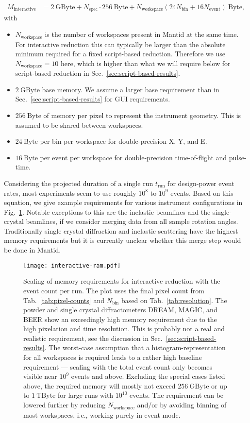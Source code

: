 \documentclass[a4paper,english,numbers=noenddot,bibliography=totoc,chapterprefix=on,DIV=12]{scrartcl}
\newcommand{\Trun}{t_{\text{run}}}
\newcommand{\Nbin}{N_{\text{bin}}}
\newcommand{\Nevent}{N_{\text{event}}}
\newcommand{\Nworkspace}{N_{\text{workspace}}}
\newcommand{\Nspec}{N_{\text{spec}}}
\newcommand{\beer}{BEER\xspace}
\newcommand{\dream}{DREAM\xspace}
\newcommand{\magic}{MAGIC\xspace}
\newcommand{\mantid}{Mantid\xspace}
\begin{document}
\begin{align}
  \label{eq:ram-interactive}
  M_{\text{interactive}} &= 2~\mathrm{GByte} + \Nspec \cdot 256~\mathrm{Byte} + N_{\text{workspace}}(24\Nbin + 16\Nevent)~\mathrm{Byte},
\end{align}
with
\begin{itemize}
  \item $\Nworkspace$ is the number of workspaces present in \mantid at the same time.
    For interactive reduction this can typically be larger than the absolute minimum required for a fixed script-based reduction.
    Therefore we use $\Nworkspace = 10$ here, which is higher than what we will require below for script-based reduction in Sec.~\ref{sec:script-based-results}.
  \item $2~\mathrm{GByte}$ base memory.
    We assume a larger base requirement than in Sec.~\ref{sec:script-based-results} for GUI requirements.
  \item $256~\mathrm{Byte}$ of memory per pixel to represent the instrument geometry.
    This is assumed to be shared between workspaces.
  \item $24~\mathrm{Byte}$ per bin per workspace for double-precision X, Y, and E.
  \item $16~\mathrm{Byte}$ per event per workspace for double-precision time-of-flight and pulse-time.
\end{itemize}
Considering the projected duration of a single run $\Trun$ for design-power event rates, most experiments seem to use roughly $10^8$ to $10^9$ events.
Based on this equation, we give example requirements for various instrument configurations in Fig.~\ref{fig:interactive-ram}.
Notable exceptions to this are the inelastic beamlines and the single-crystal beamlines, if we consider merging data from all sample rotation angles.
Traditionally single crystal diffraction and inelastic scattering have the highest memory requirements but it is currently unclear whether this merge step would be done in \mantid.

\begin{figure}
  \centering
\texttt{[image: interactive-ram.pdf]}
\caption{\label{fig:interactive-ram}
Scaling of memory requirements for interactive reduction with the event count per run.
The plot uses the final pixel count from Tab.~\ref{tab:pixel-counts} and $\Nbin$ based on Tab.~\ref{tab:resolution}.
The powder and single crystal diffractometers \dream, \magic, and \beer show an exceedingly high memory requirement due to the high pixelation and time resolution.
This is probably not a real and realistic requirement, see the discussion in Sec.~\ref{sec:script-based-results}.
The worst-case assumption that a histogram-representation for all workspaces is required leads to a rather high baseline requirement --- scaling with the total event count only becomes visible near $10^9$ events and above.
Excluding the special cases listed above, the required memory will mostly not exceed $256~\mathrm{GByte}$ or up to $1~\mathrm{TByte}$ for large runs with $10^{10}$ events.
The requirement can be lowered further by reducing $\Nworkspace$ and/or by avoiding binning of most workspaces, i.e., working purely in event mode.
}
\end{figure}
\end{document}
